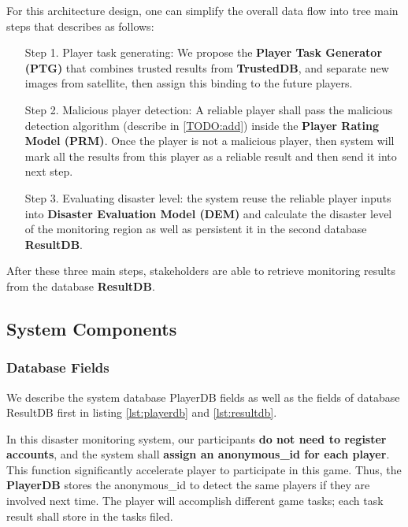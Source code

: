 For this architecture design, one can simplify the overall data flow into tree main steps 
that describes as follows:

\begin{itemize}

\item [Step 1.]  Player task generating: 
We propose the \textbf{Player Task Generator (PTG)}
that combines trusted results from \textbf{TrustedDB}, 
and separate new images from satellite, then assign this binding to the future players.

\item [Step 2.] Malicious player detection: 
A reliable player shall pass the malicious detection algorithm (describe in \ref{TODO:add})
inside the \textbf{Player Rating Model (PRM)}. 
Once the player is not a malicious player, then system will mark all the results from this player
as a reliable result and then send it into next step.

\item [Step 3.] Evaluating disaster level:  the system reuse the reliable player inputs 
into \textbf{Disaster Evaluation Model (DEM)} and calculate the disaster level of the monitoring region
 as well as persistent it in the second database \textbf{ResultDB}.

\end{itemize}

After these three main steps, stakeholders are able to retrieve monitoring results from
the database \textbf{ResultDB}. 

\subsection{System Components}

\subsubsection{Database Fields}

We describe the system database PlayerDB 
fields as well as the fields of database ResultDB first in listing \ref{lst:playerdb}
and \ref{lst:resultdb}.

In this disaster monitoring system, our participants \textbf{do not need to register accounts},
and the system shall \textbf{assign an anonymous\_id for each player}. 
This function significantly accelerate player to participate in this game. 
Thus, the \textbf{PlayerDB} stores the anonymous\_id to detect the same players if they are involved next time. 
The player will accomplish different game tasks; each task result shall store in the tasks filed.

